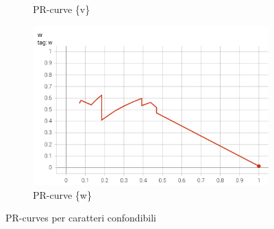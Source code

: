 \begin{figure}[htbp]
\begin{subfigure}[t]{0.32\textwidth}
        \caption{PR-curve \{v\}}
    \end{subfigure}
    \begin{subfigure}[t]{0.32\textwidth}
        \centering
        \includegraphics[width=\textwidth]{images/pr_curve_conf3.png}
        \caption{PR-curve \{w\}}
    \end{subfigure}
    \caption{PR-curves per caratteri confondibili}
    \label{fig:pr-confondibili}
\end{figure}

